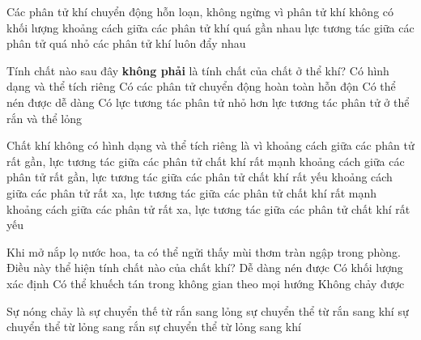 \begin{ex} 
Các phân tử khí chuyển động hỗn loạn, không ngừng vì
\choice
{ phân tử khí không có khối lượng}
{ khoảng cách giữa các phân tử khí quá gần nhau}
{\True lực tương tác giữa các phân tử quá nhỏ}
{ các phân tử khí luôn đẩy nhau}
\loigiai{ }
\end{ex}


\begin{ex}
Tính chất nào sau đây \textbf{không phải} là tính chất của chất ở thể khí?
\choice
{\True Có hình dạng và thể tích riêng}
{ Có các phân tử chuyển động hoàn toàn hỗn độn}
{ Có thể nén được dễ dàng}
{ Có lực tương tác phân tử nhỏ hơn lực tương tác phân tử ở thể rắn và thể lỏng}
\loigiai{ }
\end{ex}


\begin{ex}
Chất khí không có hình dạng và thể tích riêng là vì
\choice
{ khoảng cách giữa các phân tử rất gần, lực tương tác giữa các phân tử chất khí rất mạnh}
{ khoảng cách giữa các phân tử rất gần, lực tương tác giữa các phân tử chất khí rất yếu}
{ khoảng cách giữa các phân tử rất xa, lực tương tác giữa các phân tử chất khí rất mạnh}
{\True khoảng cách giữa các phân tử rất xa, lực tương tác giữa các phân tử chất khí rất yếu}
\loigiai{ }
\end{ex}


\begin{ex}
Khi mở nắp lọ nước hoa, ta có thể ngửi thấy mùi thơm tràn ngập trong phòng. Điều này thể hiện tính chất nào của chất khí?
\choice
{ Dễ dàng nén được}
{ Có khối lượng xác định}
{\True Có thể khuếch tán trong không gian theo mọi hướng}
{ Không chảy được}
\loigiai{ }
\end{ex}


\begin{ex}
Sự nóng chảy là
\choice
{\True sự chuyển thế từ rắn sang lỏng}
{ sự chuyển thể từ rắn sang khí}
{ sự chuyển thể từ lỏng sang rắn}
{ sự chuyển thể từ lỏng sang khí}
\loigiai{ }
\end{ex}



